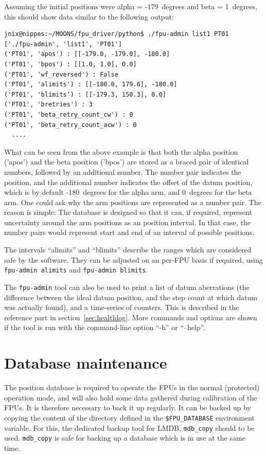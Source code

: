 \documentclass[fontsize=12,a4paper]{scrreprt}
\begin{document}
Assuming the initial positions were alpha = -179\degree\ degrees and beta =
1\degree\ degrees, this should show data similar to the following output:

\begin{verbatim}
jnix@nippes:~/MOONS/fpu_driver/python$ ./fpu-admin list1 PT01
['./fpu-admin', 'list1', 'PT01']
('PT01', 'apos') : [[-179.0, -179.0], -180.0]
('PT01', 'bpos') : [[1.0, 1.0], 0.0]
('PT01', 'wf_reversed') : False
('PT01', 'alimits') : [[-180.0, 179.6], -180.0]
('PT01', 'blimits') : [[-179.3, 150.3], 0.0]
('PT01', 'bretries') : 3
('PT01', 'beta_retry_count_cw') : 0
('PT01', 'beta_retry_count_acw') : 0
  ....
\end{verbatim}

What can be seen from the above example is that both the alpha
position ('apos') and the beta position ('bpos') are stored as a
braced pair of identical numbers, followed by an additional
number. The number pair indicates the position, and the additional
number indicates the offset of the datum position, which is by default
-180\degree\ degrees for the alpha arm, and 0\degree\ degrees for the beta arm. One
could ask why the arm positions are represented as a number pair. The
reason is simple: The database is designed so that it can, if
required, represent uncertainty around the arm positions as an
position interval. In that case, the number pairs would represent
start and end of an interval of possible positions.

The intervals ``alimits'' and ``blimits'' describe the ranges which
are considered safe by the software. They can be adjusted on an
per-FPU basis if required, using \texttt{fpu-admin alimits} and
\texttt{fpu-admin blimits}.

The \texttt{fpu-admin} tool can also be used to print a list of datum
aberrations (the difference between the ideal datum position, and the
step count at which datum was actually found), and a time-series of
counters. This is described in the reference part in
section~\ref{sec:healthlog}. More commands and options are shown if the
tool is run with the command-line option ``-h'' or ``--help''.

\section{Database maintenance}
 The position database is
required to operate the FPUs in the normal (protected) operation mode,
and will also hold some data gathered during calibration of the
FPUs. It is therefore necessary to back it up regularly.  It can be
backed up by copying the content of the directory defined in the
\verb+$FPU_DATABASE+ environment variable. For this, the dedicated
backup tool for LMDB, \texttt{mdb\_copy} should to be
used. \texttt{mdb\_copy} is safe for backing up a database which is in
use at the same time.
\end{document}
